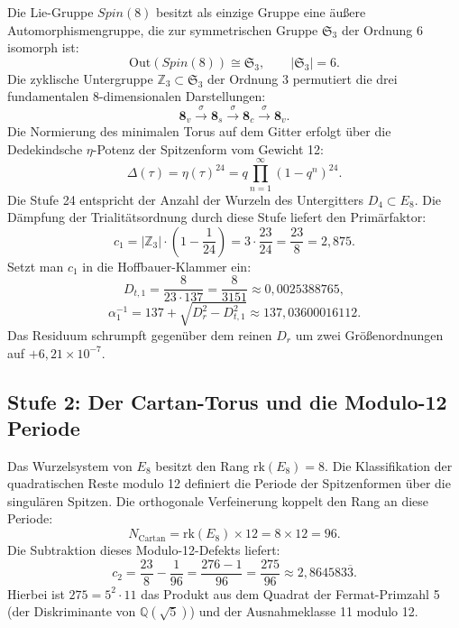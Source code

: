\documentclass[11pt,a4paper]{article}
\theoremstyle{definition}
\theoremstyle{remark}
\numberwithin{equation}{section}
\begin{document}
Die Lie-Gruppe $Spin(8)$ besitzt als einzige Gruppe eine äußere Automorphismengruppe, die zur symmetrischen Gruppe $\mathfrak{S}_3$ der Ordnung 6 isomorph ist:
\begin{equation}
\mathrm{Out}(Spin(8)) \cong \mathfrak{S}_3, \qquad |\mathfrak{S}_3| = 6.
\end{equation}
Die zyklische Untergruppe $\mathbb{Z}_3 \subset \mathfrak{S}_3$ der Ordnung 3 permutiert die drei fundamentalen 8-dimensionalen Darstellungen:
\begin{equation}
\mathbf{8}_v \xrightarrow{\;\sigma\;} \mathbf{8}_s \xrightarrow{\;\sigma\;} \mathbf{8}_c \xrightarrow{\;\sigma\;} \mathbf{8}_v.
\end{equation}
Die Normierung des minimalen Torus auf dem Gitter erfolgt über die Dedekindsche $\eta$-Potenz der Spitzenform vom Gewicht 12:
\begin{equation}
\Delta(\tau) = \eta(\tau)^{24} = q \prod_{n=1}^\infty (1 - q^n)^{24}.
\end{equation}
Die Stufe 24 entspricht der Anzahl der Wurzeln des Untergitters $D_4 \subset E_8$. Die Dämpfung der Trialitätsordnung durch diese Stufe liefert den Primärfaktor:
\begin{equation}
c_1 = |\mathbb{Z}_3| \cdot \left(1 - \frac{1}{24}\right) = 3 \cdot \frac{23}{24} = \frac{23}{8} = 2{,}875.
\end{equation}
Setzt man $c_1$ in die Hoffbauer-Klammer ein:
\begin{equation}
D_{t,1} = \frac{8}{23 \cdot 137} = \frac{8}{3151} \approx 0{,}0025388765,
\end{equation}
\begin{equation}
\alpha^{-1}_1 = 137 + \sqrt{D_r^2 - D_{t,1}^2} \approx 137{,}03600016112.
\end{equation}
Das Residuum schrumpft gegenüber dem reinen $D_r$ um zwei Größenordnungen auf $+6{,}21 \times 10^{-7}$.

\subsection{Stufe 2: Der Cartan-Torus und die Modulo-12 Periode}

Das Wurzelsystem von $E_8$ besitzt den Rang $\mathrm{rk}(E_8) = 8$. Die Klassifikation der quadratischen Reste modulo 12 definiert die Periode der Spitzenformen über die singulären Spitzen. Die orthogonale Verfeinerung koppelt den Rang an diese Periode:
\begin{equation}
N_{\mathrm{Cartan}} = \mathrm{rk}(E_8) \times 12 = 8 \times 12 = 96.
\end{equation}
Die Subtraktion dieses Modulo-12-Defekts liefert:
\begin{equation}
c_2 = \frac{23}{8} - \frac{1}{96} = \frac{276 - 1}{96} = \frac{275}{96} \approx 2{,}864583\overline{3}.
\end{equation}
Hierbei ist $275 = 5^2 \cdot 11$ das Produkt aus dem Quadrat der Fermat-Primzahl 5 (der Diskriminante von $\mathbb{Q}(\sqrt{5})$) und der Ausnahmeklasse 11 modulo 12.
\end{document}
